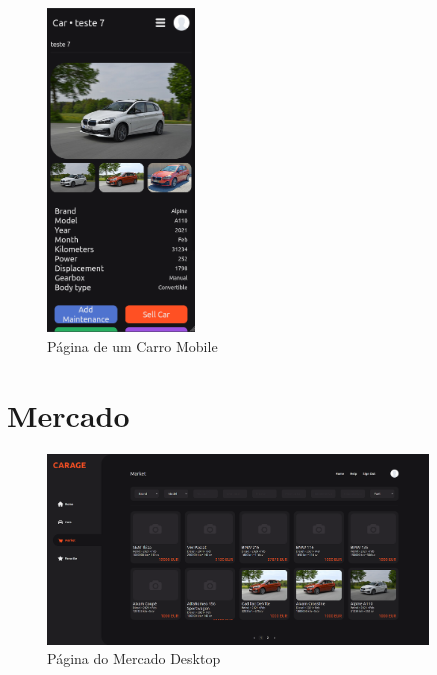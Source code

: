 \documentclass[a4paper]{report}
\begin{document}
\begin{figure}[H]
    \centering
    \includegraphics[width=0.35\textwidth]{images/car_mobile.png}
    \caption{Página de um Carro Mobile}
\end{figure}

\section{Mercado}

\begin{figure}[H]
    \centering
    \includegraphics[width=0.9\textwidth]{images/market.png}
    \caption{Página do Mercado Desktop}
\end{figure}
\end{document}
